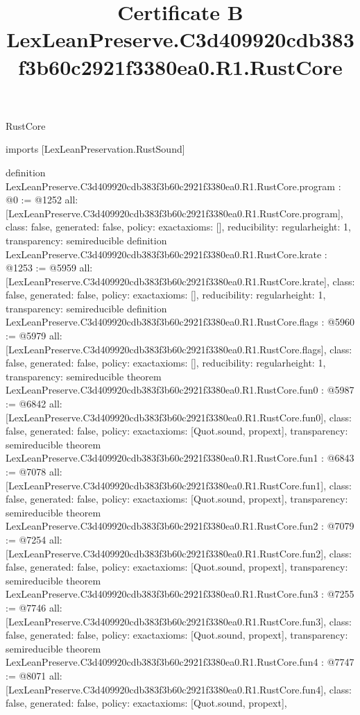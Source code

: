 \begin{lexlean}{RustCore}
\title{Certificate B LexLeanPreserve.C3d409920cdb383f3b60c2921f3380ea0.R1.RustCore}
\begin{coremodule}
imports [LexLeanPreservation.RustSound]

definition LexLeanPreserve.C3d409920cdb383f3b60c2921f3380ea0.R1.RustCore.program : @0 := @1252 {
  all: [LexLeanPreserve.C3d409920cdb383f3b60c2921f3380ea0.R1.RustCore.program],
  class: false,
  generated: false,
  policy: exact{axioms: []},
  reducibility: regular{height: 1},
  transparency: semireducible
}
definition LexLeanPreserve.C3d409920cdb383f3b60c2921f3380ea0.R1.RustCore.krate : @1253 := @5959 {
  all: [LexLeanPreserve.C3d409920cdb383f3b60c2921f3380ea0.R1.RustCore.krate],
  class: false,
  generated: false,
  policy: exact{axioms: []},
  reducibility: regular{height: 1},
  transparency: semireducible
}
definition LexLeanPreserve.C3d409920cdb383f3b60c2921f3380ea0.R1.RustCore.flags : @5960 := @5979 {
  all: [LexLeanPreserve.C3d409920cdb383f3b60c2921f3380ea0.R1.RustCore.flags],
  class: false,
  generated: false,
  policy: exact{axioms: []},
  reducibility: regular{height: 1},
  transparency: semireducible
}
theorem LexLeanPreserve.C3d409920cdb383f3b60c2921f3380ea0.R1.RustCore.fun0 : @5987 := @6842 {
  all: [LexLeanPreserve.C3d409920cdb383f3b60c2921f3380ea0.R1.RustCore.fun0],
  class: false,
  generated: false,
  policy: exact{axioms: [Quot.sound, propext]},
  transparency: semireducible
}
theorem LexLeanPreserve.C3d409920cdb383f3b60c2921f3380ea0.R1.RustCore.fun1 : @6843 := @7078 {
  all: [LexLeanPreserve.C3d409920cdb383f3b60c2921f3380ea0.R1.RustCore.fun1],
  class: false,
  generated: false,
  policy: exact{axioms: [Quot.sound, propext]},
  transparency: semireducible
}
theorem LexLeanPreserve.C3d409920cdb383f3b60c2921f3380ea0.R1.RustCore.fun2 : @7079 := @7254 {
  all: [LexLeanPreserve.C3d409920cdb383f3b60c2921f3380ea0.R1.RustCore.fun2],
  class: false,
  generated: false,
  policy: exact{axioms: [Quot.sound, propext]},
  transparency: semireducible
}
theorem LexLeanPreserve.C3d409920cdb383f3b60c2921f3380ea0.R1.RustCore.fun3 : @7255 := @7746 {
  all: [LexLeanPreserve.C3d409920cdb383f3b60c2921f3380ea0.R1.RustCore.fun3],
  class: false,
  generated: false,
  policy: exact{axioms: [Quot.sound, propext]},
  transparency: semireducible
}
theorem LexLeanPreserve.C3d409920cdb383f3b60c2921f3380ea0.R1.RustCore.fun4 : @7747 := @8071 {
  all: [LexLeanPreserve.C3d409920cdb383f3b60c2921f3380ea0.R1.RustCore.fun4],
  class: false,
  generated: false,
  policy: exact{axioms: [Quot.sound, propext]},
}
\end{coremodule}
\end{lexlean}
